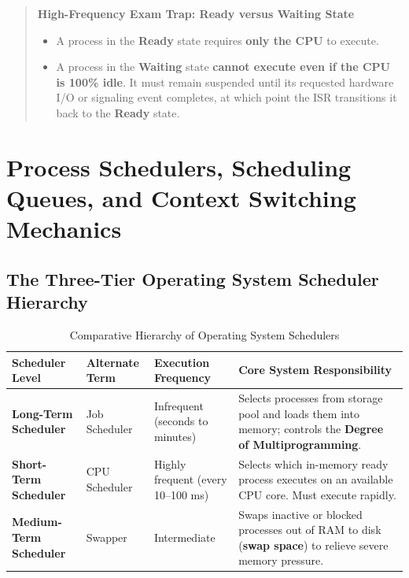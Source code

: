 \begin{quote}
\textbf{High-Frequency Exam Trap: Ready versus Waiting State}
\begin{itemize}
    \item A process in the \textbf{Ready} state requires \textbf{only the CPU} to execute.
    \item A process in the \textbf{Waiting} state \textbf{cannot execute even if the CPU is 100\% idle}. It must remain suspended until its requested hardware I/O or signaling event completes, at which point the ISR transitions it back to the \textbf{Ready} state.
\end{itemize}
\end{quote}

\section{Process Schedulers, Scheduling Queues, and Context Switching Mechanics}
\label{sec:os_schedulers_context}

\subsection{The Three-Tier Operating System Scheduler Hierarchy}
\begin{table}[htbp]
\centering
\small
\caption{Comparative Hierarchy of Operating System Schedulers}
\label{tab:os_schedulers}
\begin{tabularx}{\textwidth}{p{3.2cm} p{3.2cm} p{3.2cm} X}
\toprule
\textbf{Scheduler Level} & \textbf{Alternate Term} & \textbf{Execution Frequency} & \textbf{Core System Responsibility} \\
\midrule
\textbf{Long-Term Scheduler} & Job Scheduler & Infrequent (seconds to minutes) & Selects processes from storage pool and loads them into memory; controls the \textbf{Degree of Multiprogramming}. \\
\textbf{Short-Term Scheduler} & CPU Scheduler & Highly frequent (every 10--100 ms) & Selects which in-memory ready process executes on an available CPU core. Must execute rapidly. \\
\textbf{Medium-Term Scheduler} & Swapper & Intermediate & Swaps inactive or blocked processes out of RAM to disk (\textbf{swap space}) to relieve severe memory pressure. \\
\bottomrule
\end{tabularx}
\end{table}

